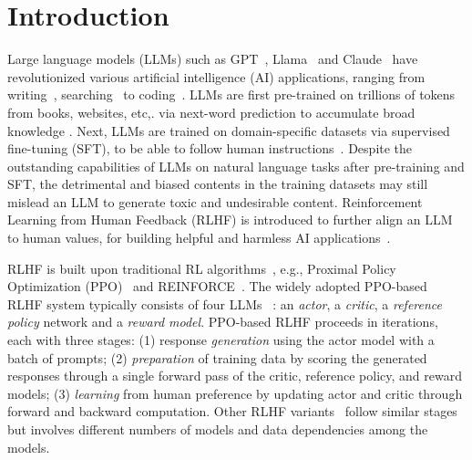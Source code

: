 \section{Introduction} \label{sec:intro}

Large language models (LLMs) such as %
GPT~\cite{gpt3}, Llama~\cite{touvron2023llama} and Claude~\cite{bai2022training} have revolutionized various artificial intelligence (AI) applications, ranging from writing~\cite{openai2023gpt4}, searching~\cite{nakano2021webgpt} to coding~\cite{rozière2023codellama}. 
LLMs are first pre-trained on trillions of tokens from books, websites, etc,. via next-word prediction to accumulate broad knowledge \cite{gpt3}. Next, LLMs are trained on domain-specific datasets via supervised fine-tuning (SFT), to be able to follow human instructions~\cite{gpt3}. Despite the outstanding capabilities of LLMs on natural language tasks after pre-training and SFT, the detrimental and biased contents in the training datasets may still mislead an LLM to generate toxic and undesirable content. Reinforcement Learning from Human Feedback (RLHF) %
is introduced to further align an LLM to human values, for building helpful and harmless AI applications~\cite{bai2022training, ouyang2022training}.

RLHF is built upon %
traditional RL algorithms~\cite{schulman2017proximal, williams1992REINFORCE, akrour2011preference_tradtionrl}, e.g., Proximal Policy Optimization 
(PPO)~\cite{schulman2017proximal} and REINFORCE~\cite{williams1992REINFORCE}.
The widely adopted PPO-based RLHF system typically consists of four LLMs~\cite{bai2022training, ouyang2022training}%
: an \textit{actor}, a \textit{critic}, a \textit{reference policy} network and a \textit{reward model}.
PPO-based RLHF proceeds in iterations, each with three stages: (1) response \textit{generation} using the actor model with a batch of prompts;
(2) \textit{preparation} of 
training data by scoring the generated responses through a single forward pass of the critic, reference policy, and reward models;
(3) \textit{learning} from human preference by updating actor and critic through forward and backward computation.
Other RLHF variants~\cite{daiSafeRLHFSafe2023, li2023remax} follow similar stages but involves different numbers of models and data dependencies among the models.


